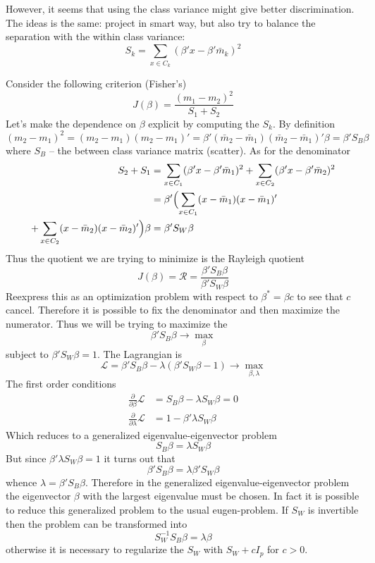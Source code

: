 \documentclass[a4paper]{article}
\newcommand{\Lcal}{\mathcal{L}}
\begin{document}
However, it seems that using the class variance might give better discrimination.
The ideas is the same: project in smart way, but also try to balance the separation
with the within class variance:
\[S_k = \sum_{x\in C_k} (\beta'x-\beta'\bar{m}_k)^2\]

Consider the following criterion (Fisher's)
\[J(\beta) =\frac{(m_1-m_2)^2}{S_1+S_2} \]
Let's make the dependence on $\beta$ explicit by computing the $S_k$.
By definition 
\[
(m_2-m_1)^2
= (m_2-m_1)(m_2-m_1)'
= \beta'(\bar{m}_2-\bar{m}_1)(\bar{m}_2-\bar{m}_1)'\beta
= \beta'S_B\beta
\]
where $S_B$ -- the between class variance matrix (scatter). As for the denominator
\begin{align*}
	S_2+S_1
	&= \sum_{x\in C_1} (\beta'x-\beta'\bar{m}_1)^2 + \sum_{x\in C_2} (\beta'x-\beta'\bar{m}_2)^2 \\
	&= \beta'\Bigl(\sum_{x\in C_1} (x-\bar{m}_1)(x-\bar{m}_1)'\\
		+ \sum_{x\in C_2} (x-\bar{m}_2)(x-\bar{m}_2)'\Bigr) \beta
	&= \beta'S_W\beta
\end{align*}
Thus the quotient we are trying to minimize is the Rayleigh quotient
\[J(\beta) = \mathcal{R} = \frac{\beta'S_B\beta}{\beta'S_W\beta}\]
Reexpress this as an optimization problem with respect to $\beta^* = \beta c$
to see that $c$ cancel. Therefore it is possible to fix the denominator and
then maximize the numerator. Thus we will be trying to maximize the 
\[\beta'S_B\beta\to\max_\beta\]
subject to $\beta'S_W\beta = 1$. The Lagrangian is
\[\Lcal = \beta'S_B\beta - \lambda(\beta'S_W\beta-1)\to\max_{\beta,\lambda}\]
The first order conditions
\begin{align*}
	\frac{\partial}{\partial\beta} \Lcal &= S_B\beta - \lambda S_W\beta = 0\\
	\frac{\partial}{\partial\lambda} \Lcal &= 1 - \beta'\lambda S_W\beta
\end{align*}
Which reduces to a generalized eigenvalue-eigenvector problem
\[
S_B\beta = \lambda S_W\beta
\]
But since $\beta'\lambda S_W\beta=1$ it turns out that
\[\beta'S_B\beta = \lambda \beta'S_W\beta\]
whence $\lambda = \beta'S_B\beta$. Therefore in the generalized eigenvalue-eigenvector
problem the eigenvector $\beta$ with the largest eigenvalue must be chosen. In fact
it is possible to reduce this generalized problem to the usual eugen-problem.
If $S_W$ is invertible then the problem can be transformed into
\[S_W^{-1}S_B \beta = \lambda \beta\]
otherwise it is necessary to regularize the $S_W$ with $S_W + cI_p$ for $c>0$.
\end{document}
